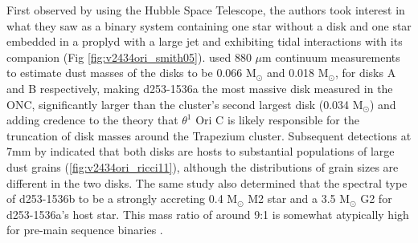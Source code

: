 \begin{figure}[htp]
  \hspace*{\fill}%
  \hfill%
  \hfill%
  \hfill%
  \hspace*{\fill}%
\end{figure}

First observed by \citet{Smith2005} using the Hubble Space Telescope, the authors took interest in what they saw as a binary system containing one star without a disk and one star embedded in a proplyd with a large jet and exhibiting tidal interactions with its companion (Fig \ref{fig:v2434ori_smith05}). \citet{MannWilliams2009} used 880 $\mu$m continuum measurements to estimate dust masses of the disks to be 0.066 M$_{\odot}$ and 0.018 M$_{\odot}$, for disks A and B respectively, making d253-1536a the most massive disk measured in the ONC, significantly larger than the cluster's second largest disk (0.034 M$_\odot$) and adding credence to the theory that $\theta^1$ Ori C is likely responsible for the truncation of disk masses around the Trapezium cluster. Subsequent detections at 7mm by \cite{Ricci2011} indicated that both disks are hosts to substantial populations of large dust grains (\ref{fig:v2434ori_ricci11}), although the distributions of grain sizes are different in the two disks. The same study also determined that the spectral type of d253-1536b to be a strongly accreting 0.4 M$_\odot$ M2 star and a 3.5 M$_\odot$ G2 for d253-1536a's host star. This mass ratio of around 9:1 is somewhat atypically high for pre-main sequence binaries \citep{DucheneKraus2013}.


